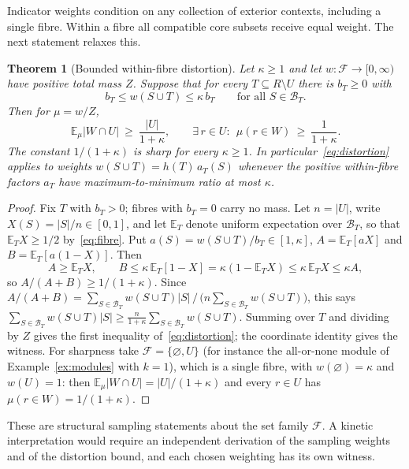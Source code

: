 \documentclass[11pt,a4paper]{article}
\theoremstyle{plain}
\newtheorem{theorem}{Theorem}[section]
\theoremstyle{definition}
\theoremstyle{remark}
\newcommand{\FF}{\mathcal F}
\newcommand{\BB}{\mathcal B}
\newcommand{\E}{\mathbb E}
\begin{document}
Indicator weights condition on any collection of exterior contexts, including a single fibre. Within a fibre all compatible core subsets receive equal weight. The next statement relaxes this.

\begin{theorem}[Bounded within-fibre distortion]\label{thm:distortion}
Let $\kappa\ge1$ and let $w:\FF\to[0,\infty)$ have positive total mass $Z$. Suppose that for every $T\subseteq R\setminus U$ there is $b_T\ge0$ with
\begin{equation}\label{eq:distortion-hyp}
 b_T\le w(S\cup T)\le\kappa\,b_T\qquad\text{for all }S\in\BB_T .
\end{equation}
Then for $\mu=w/Z$,
\begin{equation}\label{eq:distortion}
 \E_\mu|W\cap U|\ \ge\ \frac{|U|}{1+\kappa},\qquad
 \exists\,r\in U:\ \ \mu(r\in W)\ \ge\ \frac1{1+\kappa}.
\end{equation}
The constant $1/(1+\kappa)$ is sharp for every $\kappa\ge1$. In particular~\eqref{eq:distortion} applies to weights $w(S\cup T)=h(T)\,a_T(S)$ whenever the positive within-fibre factors $a_T$ have maximum-to-minimum ratio at most $\kappa$.
\end{theorem}
\begin{proof}
Fix $T$ with $b_T>0$; fibres with $b_T=0$ carry no mass. Let $n=|U|$, write $X(S)=|S|/n\in[0,1]$, and let $\E_T$ denote uniform expectation over $\BB_T$, so that $\E_TX\ge1/2$ by~\eqref{eq:fibre}. Put $a(S)=w(S\cup T)/b_T\in[1,\kappa]$, $A=\E_T[aX]$ and $B=\E_T[a(1-X)]$. Then
\[
 A\ge\E_TX,\qquad B\le\kappa\,\E_T[1-X]=\kappa(1-\E_TX)\le\kappa\,\E_TX\le\kappa A,
\]
so $A/(A+B)\ge1/(1+\kappa)$. Since $A/(A+B)=\sum_{S\in\BB_T}w(S\cup T)|S|\,/\,\bigl(n\sum_{S\in\BB_T}w(S\cup T)\bigr)$, this says $\sum_{S\in\BB_T}w(S\cup T)|S|\ge\frac n{1+\kappa}\sum_{S\in\BB_T}w(S\cup T)$. Summing over $T$ and dividing by $Z$ gives the first inequality of~\eqref{eq:distortion}; the coordinate identity gives the witness. For sharpness take $\FF=\{\varnothing,U\}$ (for instance the all-or-none module of Example~\ref{ex:modules} with $k=1$), which is a single fibre, with $w(\varnothing)=\kappa$ and $w(U)=1$: then $\E_\mu|W\cap U|=|U|/(1+\kappa)$ and every $r\in U$ has $\mu(r\in W)=1/(1+\kappa)$.
\end{proof}

These are structural sampling statements about the set family $\FF$. A kinetic interpretation would require an independent derivation of the sampling weights and of the distortion bound, and each chosen weighting has its own witness.
\end{document}
